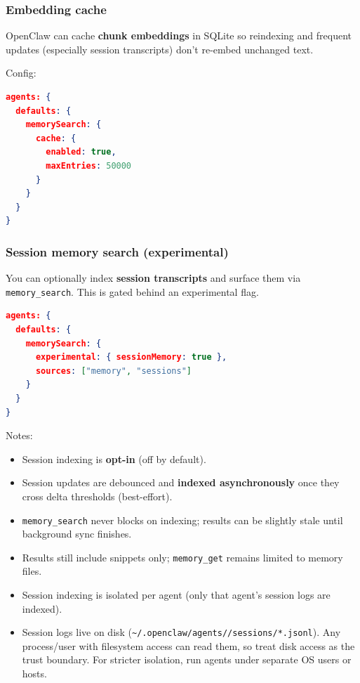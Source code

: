 \subsubsection{Embedding cache}


OpenClaw can cache \textbf{chunk embeddings} in SQLite so reindexing and frequent updates (especially session transcripts) don't re-embed unchanged text.

Config:

\begin{lstlisting}[language=json]
agents: {
  defaults: {
    memorySearch: {
      cache: {
        enabled: true,
        maxEntries: 50000
      }
    }
  }
}
\end{lstlisting}


\subsubsection{Session memory search (experimental)}


You can optionally index \textbf{session transcripts} and surface them via \texttt{memory\_search}.
This is gated behind an experimental flag.

\begin{lstlisting}[language=json]
agents: {
  defaults: {
    memorySearch: {
      experimental: { sessionMemory: true },
      sources: ["memory", "sessions"]
    }
  }
}
\end{lstlisting}


Notes:

\begin{itemize}
  \item Session indexing is \textbf{opt-in} (off by default).
  \item Session updates are debounced and \textbf{indexed asynchronously} once they cross delta thresholds (best-effort).
  \item \texttt{memory\_search} never blocks on indexing; results can be slightly stale until background sync finishes.
  \item Results still include snippets only; \texttt{memory\_get} remains limited to memory files.
  \item Session indexing is isolated per agent (only that agent’s session logs are indexed).
  \item Session logs live on disk (\texttt{\textasciitilde{}/.openclaw/agents//sessions/*.jsonl}). Any process/user with filesystem access can read them, so treat disk access as the trust boundary. For stricter isolation, run agents under separate OS users or hosts.
\end{itemize}


